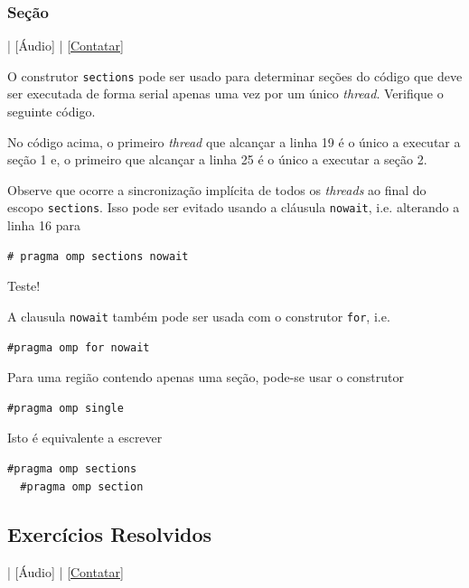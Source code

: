 

\subsubsection{Seção}

\begin{flushright}
  [Vídeo] | [Áudio] | \href{https://phkonzen.github.io/notas/contato.html}{[Contatar]}
\end{flushright}

O construtor \verb+sections+ pode ser usado para determinar seções do código que deve ser executada de forma serial apenas uma vez por um único {\it thread}. Verifique o seguinte código.



No código acima, o primeiro {\it thread} que alcançar a linha 19 é o único a executar a seção 1 e, o primeiro que alcançar a linha 25 é o único a executar a seção 2.

Observe que ocorre a sincronização implícita de todos os {\it threads} ao final do escopo \verb+sections+. Isso pode ser evitado usando a cláusula \verb+nowait+, i.e. alterando a linha 16 para
\begin{verbatim}
# pragma omp sections nowait
\end{verbatim}
Teste!

\begin{obs}
  A clausula \verb+nowait+ também pode ser usada com o construtor \verb+for+, i.e.
\begin{verbatim}
#pragma omp for nowait
\end{verbatim}
\end{obs}

Para uma região contendo apenas uma seção, pode-se usar o construtor
\begin{verbatim}
#pragma omp single
\end{verbatim}
Isto é equivalente a escrever
\begin{verbatim}
#pragma omp sections
  #pragma omp section
\end{verbatim}

\subsection*{Exercícios Resolvidos}

\begin{flushright}
  [Vídeo] | [Áudio] | \href{https://phkonzen.github.io/notas/contato.html}{[Contatar]}
\end{flushright}

